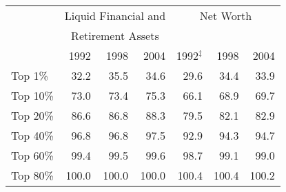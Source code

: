\begin{center}

\begin{tabular}{lrrrrrr}
\toprule
& \multicolumn{3}{c}{Liquid Financial and } &  \multicolumn{3}{c}{Net Worth} \\
& \multicolumn{3}{c}{Retirement Assets} &  \multicolumn{3}{c}{} \\
\cmidrule(r){2-4} \cmidrule(r){5-7}
& 1992 & 1998 & 2004 & 1992$^{\ddagger}$ &
1998 & 2004 \\ \midrule
Top 1\%  &  32.2  &  35.5 &  34.6 &   29.6 &  34.4 &  33.9 \\
Top 10\% &  73.0  &  73.4 &  75.3 &   66.1 &  68.9 &  69.7 \\
Top 20\% &  86.6  &  86.8 &  88.3 &   79.5 &  82.1 &  82.9 \\
Top 40\% &  96.8  &  96.8 &  97.5 &   92.9 &  94.3 &  94.7 \\
Top 60\% &  99.4  &  99.5 &  99.6 &   98.7 &  99.1 &  99.0 \\
Top 80\% & 100.0  & 100.0 & 100.0 &  100.4 & 100.4 & 100.2 \\ \bottomrule
\end{tabular}

\end{center} 

